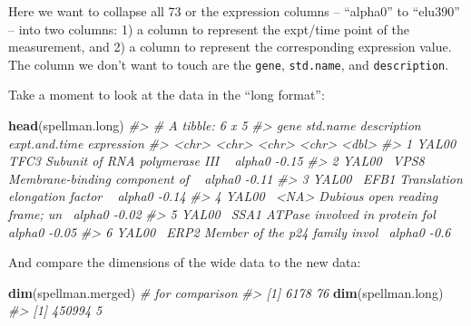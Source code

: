 \documentclass[]{book}
\newenvironment{Shaded}{\begin{snugshade}}{\end{snugshade}}
\newcommand{\CommentTok}[1]{\textcolor[rgb]{0.56,0.35,0.01}{\textit{#1}}}
\newcommand{\KeywordTok}[1]{\textcolor[rgb]{0.13,0.29,0.53}{\textbf{#1}}}
\newcommand{\NormalTok}[1]{#1}
\newcommand{\OperatorTok}[1]{\textcolor[rgb]{0.81,0.36,0.00}{\textbf{#1}}}
\newcommand{\StringTok}[1]{\textcolor[rgb]{0.31,0.60,0.02}{#1}}
\theoremstyle{definition}
\theoremstyle{definition}
\theoremstyle{definition}
\theoremstyle{remark}
\begin{document}
Here we want to collapse all 73 or the expression columns -- ``alpha0''
to ``elu390'' -- into two columns: 1) a column to represent the
expt/time point of the measurement, and 2) a column to represent the
corresponding expression value. The column we don't want to touch are
the \texttt{gene}, \texttt{std.name}, and \texttt{description}.

\begin{Shaded}
\end{Shaded}

Take a moment to look at the data in the ``long format'':

\begin{Shaded}
\begin{Highlighting}[]
\KeywordTok{head}\NormalTok{(spellman.long)}
\CommentTok{#> # A tibble: 6 x 5}
\CommentTok{#>   gene   std.name description                     expt.and.time expression}
\CommentTok{#>   <chr>  <chr>    <chr>                           <chr>              <dbl>}
\CommentTok{#> 1 YAL00~ TFC3     Subunit of RNA polymerase III ~ alpha0             -0.15}
\CommentTok{#> 2 YAL00~ VPS8     Membrane-binding component of ~ alpha0             -0.11}
\CommentTok{#> 3 YAL00~ EFB1     Translation elongation factor ~ alpha0             -0.14}
\CommentTok{#> 4 YAL00~ <NA>     Dubious open reading frame; un~ alpha0             -0.02}
\CommentTok{#> 5 YAL00~ SSA1     ATPase involved in protein fol~ alpha0             -0.05}
\CommentTok{#> 6 YAL00~ ERP2     Member of the p24 family invol~ alpha0             -0.6}
\end{Highlighting}
\end{Shaded}

And compare the dimensions of the wide data to the new data:

\begin{Shaded}
\begin{Highlighting}[]
\KeywordTok{dim}\NormalTok{(spellman.merged)  }\CommentTok{# for comparison}
\CommentTok{#> [1] 6178   76}
\KeywordTok{dim}\NormalTok{(spellman.long)}
\CommentTok{#> [1] 450994      5}
\end{Highlighting}
\end{Shaded}
\end{document}
